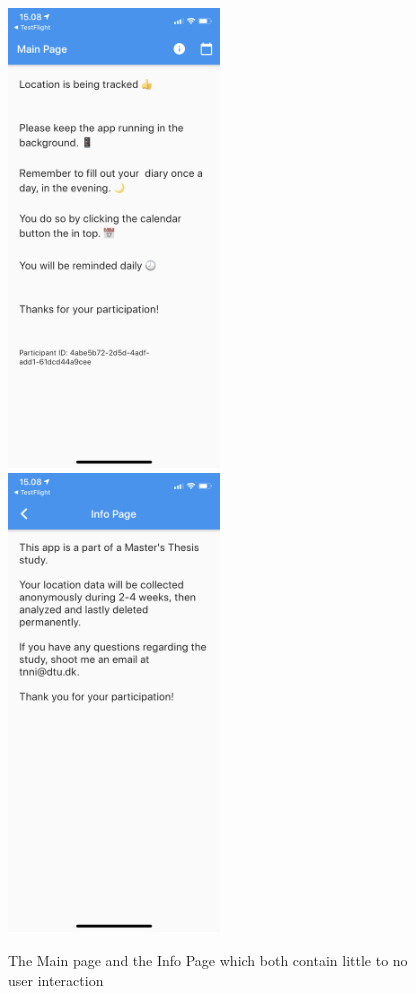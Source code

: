\begin{figure}
    \centering
    \includegraphics[width=0.5\textwidth]{images/app_imgs/app_mainpage.png}
    \includegraphics[width=0.5\textwidth]{images/app_imgs/app_infopage.png}
    \caption{The Main page and the Info Page which both contain little to no user interaction}
    \label{fig:my_label}
\end{figure}

